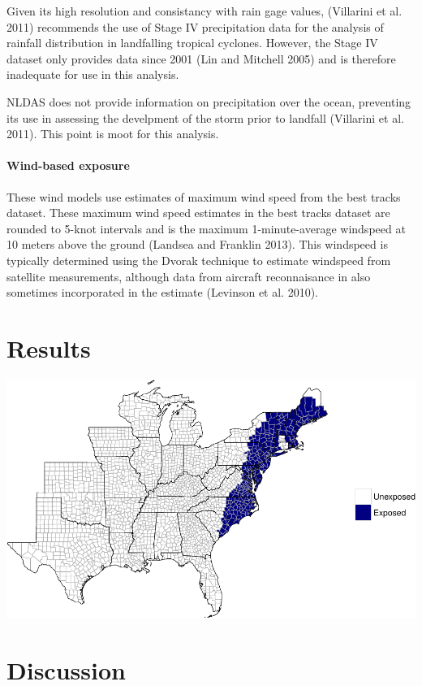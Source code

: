 \documentclass[]{elsarticle} %
\makeatletter
\def\maxwidth{\ifdim\Gin@nat@width>\linewidth\linewidth
\else\Gin@nat@width\fi}
\let\Oldincludegraphics\includegraphics
\renewcommand{\includegraphics}[1]{\Oldincludegraphics[width=\maxwidth]{#1}}
\makeatother
\begin{document}
Given its high resolution and consistancy with rain gage values,
(Villarini et al. 2011) recommends the use of Stage IV precipitation
data for the analysis of rainfall distribution in landfalling tropical
cyclones. However, the Stage IV dataset only provides data since 2001
(Lin and Mitchell 2005) and is therefore inadequate for use in this
analysis.

NLDAS does not provide information on precipitation over the ocean,
preventing its use in assessing the develpment of the storm prior to
landfall (Villarini et al. 2011). This point is moot for this analysis.

\paragraph{Wind-based exposure}\label{wind-based-exposure}

These wind models use estimates of maximum wind speed from the best
tracks dataset. These maximum wind speed estimates in the best tracks
dataset are rounded to 5-knot intervals and is the maximum
1-minute-average windspeed at 10 meters above the ground (Landsea and
Franklin 2013). This windspeed is typically determined using the Dvorak
technique to estimate windspeed from satellite measurements, although
data from aircraft reconnaisance in also sometimes incorporated in the
estimate (Levinson et al. 2010).

\section{Results}\label{results}

\includegraphics{DraftExposurePaper_files/figure-latex/unnamed-chunk-2-1.pdf}

\section{Discussion}\label{discussion}
\end{document}
